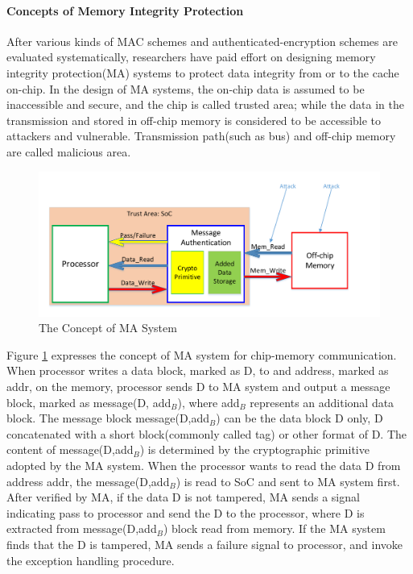 \documentclass{article}
\begin{document}
\paragraph{Concepts of Memory Integrity Protection}
After various kinds of MAC schemes and authenticated-encryption schemes are evaluated systematically, researchers have paid effort on designing memory integrity protection(MA) systems to protect data integrity from or to the cache on-chip. 
In the design of MA systems, the on-chip data is assumed to be inaccessible and secure, and the chip is called trusted area; while the data in the transmission and stored in off-chip memory is considered to be accessible to attackers and vulnerable. Transmission path(such as bus) and off-chip memory are called malicious area. 
\begin{figure}[htbp]
\centering
\includegraphics[scale=0.5]{./diagrams/MA_concept.pdf}
\caption{The Concept of MA System}
\label{fig:ma_system}
\end{figure}
Figure \ref{fig:ma_system} expresses the concept of MA system for chip-memory communication. 
When processor writes a data block, marked as D, to and address, marked as addr, on the memory, processor sends D to MA system and output a message block, marked as message(D, add$_B$), where add$_B$ represents an additional data block. The message block message(D,add$_B$) can be the data block D only, D concatenated with a short block(commonly called tag) or other format of D. The content of message(D,add$_B$) is determined by the cryptographic primitive adopted by the MA system.
When the processor wants to read the data D from address addr, the message(D,add$_B$) is read to SoC and sent to MA system first. After verified by MA, if the data D is not tampered, MA sends a signal indicating pass to processor and send the D to the processor, where D is extracted from message(D,add$_B$) block read from memory.
If the MA system finds that the D is tampered, MA sends a failure signal to processor, and invoke the exception handling procedure.
\end{document}
